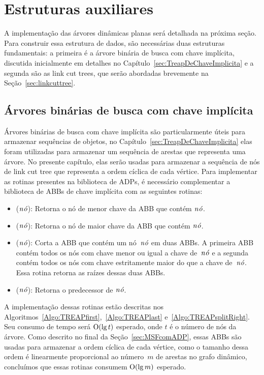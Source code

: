 \section{Estruturas auxiliares}

A implementação das árvores dinâmicas planas será detalhada na próxima seção.
Para construir essa estrutura de dados, são necessárias duas estruturas fundamentais: a primeira é a árvore binária de busca com chave implícita, discutida inicialmente em detalhes no Capítulo~\ref{sec:TreapDeChaveImplicita} e a segunda são as link cut trees, que serão abordadas brevemente na Seção~\ref{sec:linkcuttree}.

\subsection{Árvores binárias de busca com chave implícita}

Árvores binárias de busca com chave implícita são particularmente úteis para armazenar sequências de objetos, no Capítulo~\ref{sec:TreapDeChaveImplicita} elas foram utilizadas para armazenar um sequência de arestas que representa uma árvore.
No presente capítulo, elas serão usadas para armazenar a sequência de nós de link cut tree que representa a ordem cíclica de cada vértice.
Para implementar as rotinas presentes na biblioteca de ADPs, é necessário complementar a biblioteca de ABBs de chave implícita com as seguintes rotinas:
\begin{itemize}
\item \treapFirst($\mathit{n\acute{o}}$): Retorna o nó de menor chave da ABB que contém $\mathit{n\acute{o}}$.
\item \treapLast($\mathit{n\acute{o}}$): Retorna o nó de maior chave da ABB que contém $\mathit{n\acute{o}}$.
\item \treapSplitRight($\mathit{n\acute{o}}$): Corta a ABB que contém um nó~$\mathit{n\acute{o}}$ em duas ABBs. A primeira ABB contém todos os nós com chave menor ou igual a chave de~$\mathit{n\acute{o}}$ e a segunda contém todos os nós com chave estritamente maior do que a chave de~$\mathit{n\acute{o}}$. Essa rotina retorna as raízes dessas duas ABBs.
\item \treapPredecessor($\mathit{n\acute{o}}$): Retorna o predecessor de $\mathit{n\acute{o}}$.
\end{itemize}

A implementação dessas rotinas estão descritas nos Algoritmos~\ref{Algo:TREAPfirst},~\ref{Algo:TREAPlast} e~\ref{Algo:TREAPsplitRight}.
Seu consumo de tempo será $\mathrm{O}(\lg t)$ esperado, onde $t$ é o número de nós da árvore.
Como descrito no final da Seção~\ref{sec:MSFcomADP}, essas ABBs são usadas para armazenar a ordem cíclica de cada vértice, como o tamanho dessa ordem é linearmente proporcional ao número~$m$ de arestas no grafo dinâmico, concluímos que essas rotinas consumem $\mathrm{O}(\lg m)$ esperado.  

